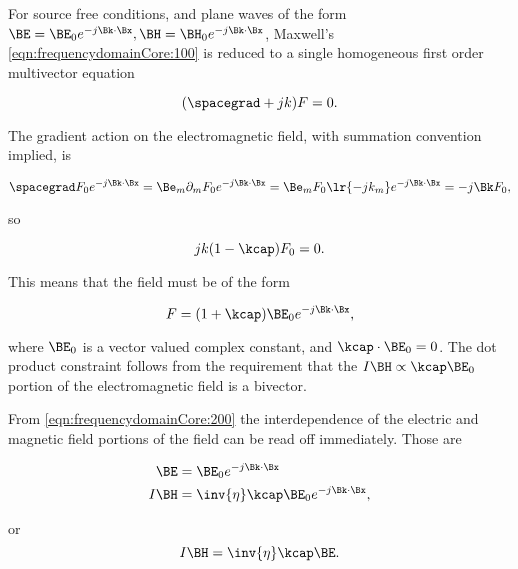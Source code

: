 For source free conditions, and plane waves of the form \( \BE = \BE_0 e^{-j \Bk \cdot \Bx}, \BH = \BH_0 e^{-j \Bk \cdot \Bx} \), Maxwell's \cref{eqn:frequencydomainCore:100} is reduced to a single homogeneous first order multivector equation

\begin{dmath}\label{eqn:frequencydomainCore:140}
(\spacegrad + j k) F = 0.
\end{dmath}

The gradient action on the electromagnetic field, with summation convention implied, is

\begin{dmath}\label{eqn:frequencydomainCore:160}
\spacegrad F_0 e^{-j \Bk \cdot \Bx}
=
\Be_m \partial_m
F_0 e^{-j \Bk \cdot \Bx}
=
\Be_m
F_0
\lr{ -j k_m }
e^{-j \Bk \cdot \Bx}
=
-j \Bk F_0,
\end{dmath}

so

\begin{dmath}\label{eqn:frequencydomainCore:180}
j k (1 - \kcap) F_0 = 0.
\end{dmath}

This means that the field must be of the form

\begin{dmath}\label{eqn:frequencydomainCore:200}
F = (1 + \kcap) \BE_0 e^{-j \Bk \cdot \Bx},
\end{dmath}

where \( \BE_0 \) is a vector valued complex constant, and \( \kcap \cdot \BE_0 = 0 \).  The dot product constraint follows from the requirement that the \( I \BH \propto \kcap \BE_0 \) portion of the electromagnetic field is a bivector.

From \cref{eqn:frequencydomainCore:200} the interdependence of the electric and magnetic field portions of the field can be read off immediately.  Those are

\begin{dmath}\label{eqn:frequencydomainCore:220}
\begin{aligned}
\BE &= \BE_0 e^{-j \Bk \cdot \Bx} \\
I \BH &= \inv{\eta} \kcap \BE_0 e^{-j \Bk \cdot \Bx},
\end{aligned}
\end{dmath}

or
\begin{dmath}\label{eqn:frequencydomainCore:380}
I \BH = \inv{\eta} \kcap \BE.
\end{dmath}

